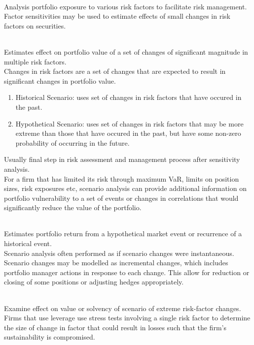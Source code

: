 \begin{remark} \\
Analysis portfolio exposure to various risk factors to facilitate risk management.\\
Factor sensitivities may be used to estimate effects of small changes in risk factors on securities.
\end{remark}

\begin{remark} \\
Estimates effect on portfolio value of a set of changes of significant magnitude in multiple risk factors.\\
Changes in risk factors are a set of changes that are expected to result in significant changes in portfolio value.
\begin{enumerate}[label=\roman*.]
\setlength{\itemsep}{0pt}
\item Historical Scenario: uses set of changes in risk factors that have occured in the past.
\item Hypothetical Scenario: uses set of changes in risk factors that may be more extreme than those that have occured in the past, but have some non-zero probability of occurring in the future.
\end{enumerate}
Usually final step in risk assessment and management process after sensitivity analysis.\\
For a firm that has limited its risk through maximum VaR, limits on position sizes, risk exposures etc, scenario analysis can provide additional information on portfolio vulnerability to a set of events or changes in correlations that would significantly reduce the value of the portfolio.
\end{remark}

\begin{remark} \\
Estimates portfolio return from a hypothetical market event or recurrence of a historical event.\\
Scenario analysis often performed as if scenario changes were instantaneous.\\
Scenario changes may be modelled as incremental changes, which includes portfolio manager actions in response to each change. This allow for reduction or closing of some positions or adjusting hedges appropriately. 
\end{remark}

\begin{remark} \\
Examine effect on value or solvency of scenario of extreme risk-factor changes.\\
Firms that use leverage use stress tests involving a single risk factor to determine the size of change in factor that could result in losses such that the firm's sustainability is compromised.
\end{remark}

